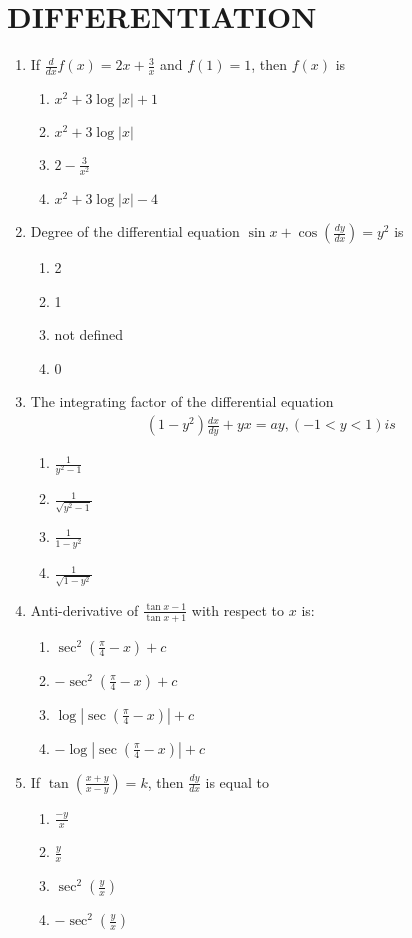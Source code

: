 \documentclass{article}
\begin{document}
\section{DIFFERENTIATION}
\begin{enumerate}
\item If $\frac{d}{dx}f(x) = 2x +\frac{3}{x}$ and $f(1) = 1$, then $f(x)$ is
\begin{enumerate}
\item $x^2 + 3 \log |x| + 1$
\item $x^2 + 3 \log |x|$
\item $2 -\frac{3}{x^2}$
\item $x^2 + 3 \log |x| - 4$
\end{enumerate}

\item Degree of the differential equation $\sin x + \cos (\frac{dy}{dx}) = y^2$ is
\begin{enumerate}
\item 2
\item 1
\item not defined
\item 0
\end{enumerate}

\item The integrating factor of the differential equation 
	\begin{align}
		(1 - y^2) \frac{dx}{dy} + yx = ay, (-1 < y < 1) is
	\end{align}
\begin{enumerate}
\item $\frac{1}{y^2-1}$
\item $\frac{1}{\sqrt{y^2 - 1}}$
\item $\frac{1}{1 - y^2}$
\item $\frac{1}{\sqrt{1-y^2}}$
\end{enumerate}
\item Anti-derivative of $\frac{\tan x-1}{\tan     x+1}$ with respect to $x$ is: 
\begin{enumerate}           
\item $\sec^2(\frac{\pi}{4}-x)+c$ 
\item $-\sec^2(\frac{\pi}{4}-x)+c$  
\item $\log\left|\sec(\frac{\pi}{4}-x)\right|+c$  
\item $-\log\left|\sec(\frac{\pi}{4}-x)\right|+c$

\end{enumerate}
\item If $\tan\left(\frac{x+y}{x-y}\right) = k$, then $\frac{dy}{dx}$ is equal to
\begin{enumerate}
\item $\frac{-y}{x}$
\item $\frac{y}{x}$
\item $\sec^2(\frac{y}{x})$
\item $-\sec^2(\frac{y}{x})$
\end{enumerate}


\end{enumerate}
\end{document}
